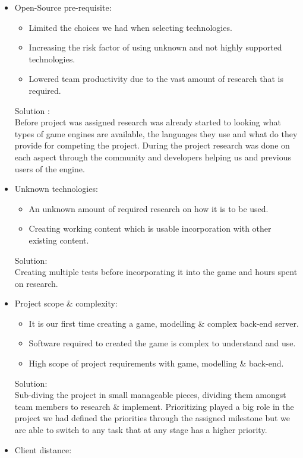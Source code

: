 \documentclass[letterpaper]{article}
\begin{document}
		\begin{itemize}
			\item Open-Source pre-requisite:
				\begin{itemize}
					\item Limited the choices we had when selecting technologies.
					\item Increasing the risk factor of using unknown and not highly supported technologies.
					\item Lowered team productivity due to the vast amount of research that is required.
				\end{itemize}
				Solution : \\
				Before project was assigned research was already started to looking what types of game engines are available, the languages they use and what do they provide for competing the project. During the project research was done on each aspect through the community and developers helping us and previous users of the engine.
			\item Unknown technologies:
				\begin{itemize}
					\item An unknown amount of required research on how it is to be used.
					\item Creating working content which is usable incorporation with other existing content.
				\end{itemize}
				Solution: \\
				Creating multiple tests before incorporating it into the game and hours spent on research.
			\item Project scope \& complexity:
				\begin{itemize}
					\item It is our first time creating a game, modelling \& complex back-end server.
					\item Software required to created the game is complex to understand and use.
					\item High scope of project requirements with game, modelling \& back-end.
				\end{itemize}
				Solution: \\
				Sub-diving the project in small manageable pieces, dividing them amongst team members to research \& implement. Prioritizing played a big role in the project we had defined the priorities through the assigned milestone but we are able to switch to any task that at any stage has a higher priority.
			\item Client distance:
				\begin{itemize}

\end{itemize}
\end{itemize}
\end{document}
